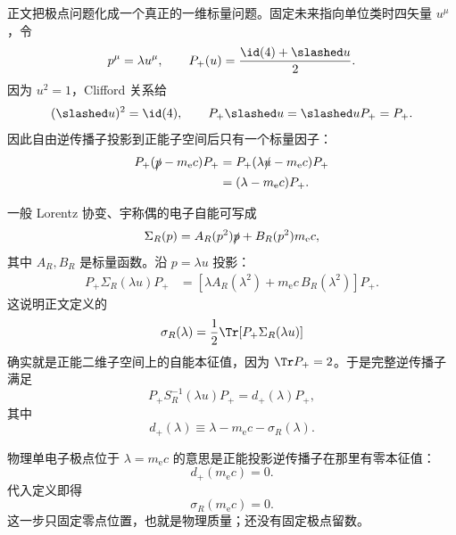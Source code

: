 \begin{derivation}[电子极点的在壳重整化条件]
正文把极点问题化成一个真正的一维标量问题。固定未来指向单位类时四矢量 $u^\mu$，令
\begin{equation*}
 p^\mu=\lambda u^\mu,
 \qquad
 P_+(u)=\frac{\id(4)+\slashed u}{2}.
\end{equation*}
因为 $u^2=1$，Clifford 关系给
\begin{equation*}
 (\slashed u)^2=\id(4),
 \qquad
 P_+\slashed u=\slashed uP_+=P_+.
\end{equation*}
因此自由逆传播子投影到正能子空间后只有一个标量因子：
\begin{align*}
 P_+(\slashed p-m_{\mathrm e} c)P_+
 &=P_+(\lambda\slashed u-m_{\mathrm e} c)P_+\\
 &=(\lambda-m_{\mathrm e} c)P_+.
\end{align*}

一般 Lorentz 协变、宇称偶的电子自能可写成
\begin{equation*}
 \Sigma_R(p)=A_R(p^2)\slashed p+B_R(p^2)m_{\mathrm e} c,
\end{equation*}
其中 $A_R,B_R$ 是标量函数。沿 $p=\lambda u$ 投影：
\begin{align*}
 P_+\Sigma_R(\lambda u)P_+
 &=\left[\lambda A_R(\lambda^2)+m_{\mathrm e} c\,B_R(\lambda^2)\right]P_+.
\end{align*}
这说明正文定义的
\begin{equation*}
 \sigma_R(\lambda)
 =\frac12\Tr\!\left[P_+\Sigma_R(\lambda u)\right]
\end{equation*}
确实就是正能二维子空间上的自能本征值，因为 $\Tr P_+=2$。于是完整逆传播子满足
\begin{equation*}
 P_+S_R^{-1}(\lambda u)P_+
 =d_+(\lambda)P_+,
\end{equation*}
其中
\begin{equation*}
 d_+(\lambda)
 \equiv\lambda-m_{\mathrm e} c-\sigma_R(\lambda).
\end{equation*}

物理单电子极点位于 $\lambda=m_{\mathrm e} c$ 的意思是正能投影逆传播子在那里有零本征值：
\begin{equation*}
 d_+(m_{\mathrm e} c)=0.
\end{equation*}
代入定义即得
\begin{equation*}
 \sigma_R(m_{\mathrm e} c)=0.
\end{equation*}
这一步只固定零点位置，也就是物理质量；还没有固定极点留数。


\end{derivation}
